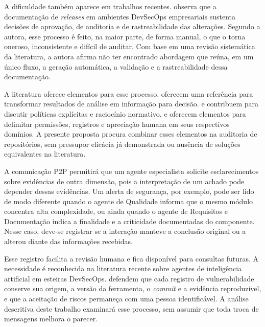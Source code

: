 A dificuldade também aparece em trabalhos recentes.  observa que a documentação de \textit{releases} em ambientes DevSecOps empresariais sustenta decisões de aprovação, de auditoria e de rastreabilidade das alterações. Segundo a autora, esse processo é feito, na maior parte, de forma manual, o que o torna oneroso, inconsistente e difícil de auditar. Com base em uma revisão sistemática da literatura, a autora afirma não ter encontrado abordagem que reúna, em um único fluxo, a geração automática, a validação e a rastreabilidade dessa documentação.

A literatura oferece elementos para esse processo.  oferecem uma referência para transformar resultados de análise em informação para decisão.  e  contribuem para discutir políticas explícitas e raciocínio normativo.  e  oferecem elementos para delimitar permissões, registros e apreciação humana em seus respectivos domínios. A presente proposta procura combinar esses elementos na auditoria de repositórios, sem pressupor eficácia já demonstrada ou ausência de soluções equivalentes na literatura.

A comunicação P2P permitirá que um agente especialista solicite esclarecimentos sobre evidências de outra dimensão, pois a interpretação de um achado pode depender dessas evidências. Um alerta de segurança, por exemplo, pode ser lido de modo diferente quando o agente de Qualidade informa que o mesmo módulo concentra alta complexidade, ou ainda quando o agente de Requisitos e Documentação indica a finalidade e a criticidade documentadas do componente. Nesse caso, deve-se registrar se a interação manteve a conclusão original ou a alterou diante das informações recebidas.

Esse registro facilita a revisão humana e fica disponível para consultas futuras. A necessidade é reconhecida na literatura recente sobre agentes de inteligência artificial em esteiras DevSecOps.  defendem que cada registro de vulnerabilidade conserve sua origem, a versão da ferramenta, o \textit{commit} e a evidência reproduzível, e que a aceitação de riscos permaneça com uma pessoa identificável. A análise descritiva deste trabalho examinará esse processo, sem assumir que toda troca de mensagens melhora o parecer.


